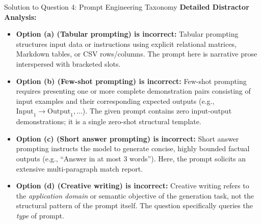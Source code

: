 \documentclass[11pt,a4paper]{article}
\begin{document}
\begin{solutionbox}{Solution to Question 4: Prompt Engineering Taxonomy}
\medskip
\textbf{Detailed Distractor Analysis:}
\begin{itemize}[leftmargin=1.8em]
    \item \textbf{Option (a) (Tabular prompting) is incorrect:} Tabular prompting structures input data or instructions using explicit relational matrices, Markdown tables, or CSV rows/columns. The prompt here is narrative prose interspersed with bracketed slots.
    \item \textbf{Option (b) (Few-shot prompting) is incorrect:} Few-shot prompting requires presenting one or more complete demonstration pairs consisting of input examples and their corresponding expected outputs (e.g., $\text{Input}_1 \to \text{Output}_1, \dots$). The given prompt contains zero input-output demonstrations; it is a single zero-shot structural template.
    \item \textbf{Option (c) (Short answer prompting) is incorrect:} Short answer prompting instructs the model to generate concise, highly bounded factual outputs (e.g., ``Answer in at most 3 words''). Here, the prompt solicits an extensive multi-paragraph match report.
    \item \textbf{Option (d) (Creative writing) is incorrect:} Creative writing refers to the \textit{application domain} or semantic objective of the generation task, not the structural pattern of the prompt itself. The question specifically queries the \textit{type} of prompt.
\end{itemize}
\end{solutionbox}
\end{document}
